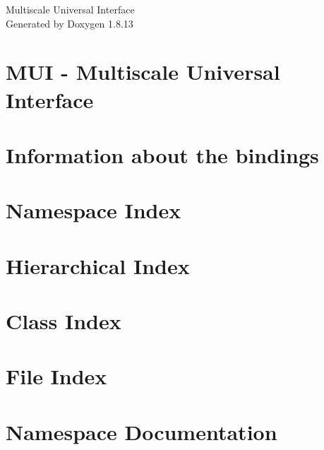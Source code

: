 \documentclass[twoside]{book}
\newcommand{\+}{\discretionary{\mbox{\scriptsize$\hookleftarrow$}}{}{}}
\newcommand{\clearemptydoublepage}{%
  \newpage{\pagestyle{empty}\cleardoublepage}%
}
\begin{document}
\hypersetup{pageanchor=false,
             bookmarksnumbered=true,
             pdfencoding=unicode
            }
\begin{titlepage}
\vspace*{7cm}
\begin{center}%
{\Large Multiscale Universal Interface }\\
\vspace*{1cm}
{\large Generated by Doxygen 1.8.13}\\
\end{center}
\end{titlepage}
\clearemptydoublepage
{}
\tableofcontents
\clearemptydoublepage
{}
\hypersetup{pageanchor=true}

\chapter{M\+UI -\/ Multiscale Universal Interface}
\label{md__r_e_a_d_m_e}

\chapter{Information about the bindings}
\label{md_wrappers__python__r_e_a_d_m_e}

\chapter{Namespace Index}

\chapter{Hierarchical Index}

\chapter{Class Index}

\chapter{File Index}

\chapter{Namespace Documentation}




















\end{document}
